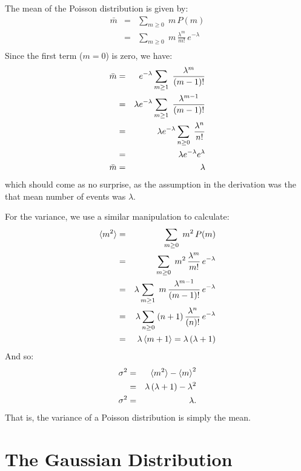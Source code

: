 \documentclass[12pt]{article}
\begin{document}
The mean of the Poisson distribution is given by:
\begin{eqnarray*}
\bar{m} &=& \sum_{m \geq 0} \; m \, P(m) \\
&=& \sum_{m \geq 0} \; m \, \frac{\lambda^m}{m!} \, e^{-\lambda}\\
\end{eqnarray*}
Since the first term ($m=0$) is zero, we have:
\begin{eqnarray}
\bar{m} &=& e^{-\lambda} \sum_{m \geq 1} \; \frac{\lambda^m}{(m-1)!} \notag \\
             &=& \lambda e^{-\lambda} \sum_{m \geq 1} \; \frac{\lambda^{m-1}}{(m-1)!} \notag \\
             &=& \lambda e^{-\lambda} \sum_{n \geq 0} \; \frac{\lambda^{n}}{n!} \notag \\
             &=& \lambda e^{-\lambda} e^\lambda \notag \\
\bar{m}  &=& \lambda
\end{eqnarray}
which should come as no surprise, as the assumption in the derivation was the that mean number of events was $\lambda$.

For the variance, we use a similar manipulation to calculate:
\begin{eqnarray*}
\braket{m^2} &=& \sum_{m \geq 0} \; m^2 \, P(m) \\
&=& \sum_{m \geq 0} \; m^2 \, \frac{\lambda^m}{m!} \, e^{-\lambda}\\
&=& \lambda \sum_{m \geq 1} \; m \, \frac{\lambda^{m-1}}{(m-1)!} \, e^{-\lambda}\\
&=& \lambda \sum_{n \geq 0} \; (n+1) \, \frac{\lambda^{n}}{(n)!} \, e^{-\lambda}\\
&=& \lambda \braket{m+1} = \lambda \, (\lambda+1)
\end{eqnarray*}
And so:
\begin{eqnarray}
\sigma^2 &=& \braket{m^2} - \braket{m}^2 \notag \\
&=& \lambda \, (\lambda+1) - \lambda^2 \notag \\
\sigma^2 &=& \lambda. 
\end{eqnarray}
That is, the variance of a Poisson distribution is simply the mean.

\section{The Gaussian Distribution}
\end{document}
